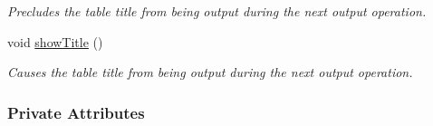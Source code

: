 \begin{DoxyCompactItemize}
\begin{DoxyCompactList}\small\item\em Precludes the table title from being output during the next output operation. \end{DoxyCompactList}\item 
void \hyperlink{structTable_a3f04cf58fdeda2b377fc81c58e098e8b}{show\+Title} ()\hypertarget{structTable_a3f04cf58fdeda2b377fc81c58e098e8b}{}\label{structTable_a3f04cf58fdeda2b377fc81c58e098e8b}

\begin{DoxyCompactList}\small\item\em Causes the table title from being output during the next output operation. \end{DoxyCompactList}\end{DoxyCompactItemize}
\subsubsection*{Private Attributes}
